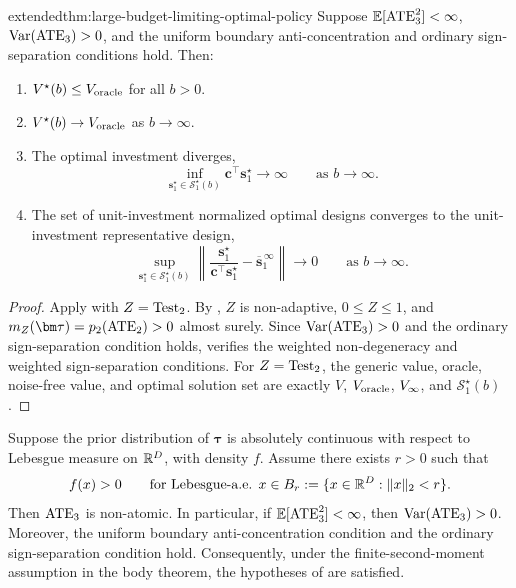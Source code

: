 \begin{linkedresult}{extended}{thm:large-budget-limiting-optimal-policy}
  \label{thm:large-budget-limiting-optimal-policy-appendix}
  Suppose $\mathbb{E}[\mathrm{ATE}_3^2]<\infty$, ${\rm Var}(\mathrm{ATE}_3)>0$, and the uniform boundary anti-concentration and ordinary sign-separation conditions  hold.
  Then:
  \begin{enumerate}
    \item[\rm (i)] $V^\star(b)\le V_{\mathrm{oracle}}$ for all $b>0$.
    \item[\rm (ii)] $V^\star(b)\to V_{\mathrm{oracle}}$ as $b\to\infty$.
    \item[\rm (iii)] The optimal investment diverges,
      \[
        \inf_{\bm s_1^\star\in\mathcal S_1^\star(b)} \bm c^\top\bm s_1^\star
        \to\infty
        \qquad\text{as }b\to\infty.
      \]
    \item[\rm (iv)] The set of unit-investment normalized optimal designs converges to the unit-investment representative design,
      \[
        \sup_{\bm s_1^\star\in\mathcal S_1^\star(b)}
        \left\|
        \frac{\bm s_1^\star}{\bm c^\top\bm s_1^\star}
        -
        \overline{\bm s}_1^{\,\infty}
        \right\|
        \to0
        \qquad\text{as }b\to\infty.
      \]
  \end{enumerate}
\end{linkedresult}

\begin{proof}
  Apply  with $Z=\operatorname{Test}_2$.
  By , $Z$ is non-adaptive, $0\le Z\le1$, and $m_Z(\bm\tau)=p_2(\ATE_2)>0$ almost surely.
  Since ${\rm Var}(\mathrm{ATE}_3)>0$ and the ordinary sign-separation condition holds,  verifies the weighted non-degeneracy and weighted sign-separation conditions.
  For $Z=\operatorname{Test}_2$, the generic value, oracle, noise-free value, and optimal solution set are exactly $V$, $V_{\mathrm{oracle}}$, $V_{\infty}$, and $\mathcal S_1^\star(b)$.
\end{proof}

\begin{proposition}
  \label{prop:density-large-budget-regularity-appendix}
  Suppose the prior distribution of $\bm\tau$ is absolutely continuous with respect to Lebesgue measure on $\mathbb{R}^D$, with density $f$.
  Assume there exists $r>0$ such that
  \[
    f(x)>0
    \qquad
    \text{for Lebesgue-a.e. }x\in B_r:=\{x\in\mathbb{R}^D:\|x\|_2<r\}.
  \]
  Then $\mathrm{ATE}_3$ is non-atomic.
  In particular, if $\mathbb{E}[\mathrm{ATE}_3^2]<\infty$, then ${\rm Var}(\mathrm{ATE}_3)>0$.
  Moreover, the uniform boundary anti-concentration condition  and the ordinary sign-separation condition  hold.
  Consequently, under the finite-second-moment assumption in the body theorem, the hypotheses of  are satisfied.
\end{proposition}


